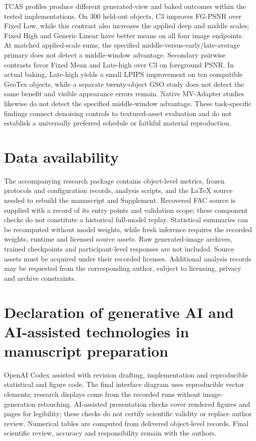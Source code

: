 \documentclass[times,twocolumn,final]{elsarticle}
\begin{document}
TCAS profiles produce different generated-view and baked outcomes within the tested implementations. On 300 held-out objects, C3 improves FG-PSNR over Fixed Low, while this contrast also increases the applied deep and middle scales; Fixed High and Generic Linear have better means on all four image endpoints. At matched applied-scale sums, the specified middle-versus-early/late-average primary does not detect a middle-window advantage. Secondary pairwise contrasts favor Fixed Mean and Late-high over C3 on foreground PSNR. In actual baking, Late-high yields a small LPIPS improvement on ten compatible GeoTex objects, while a separate twenty-object GSO study does not detect the same benefit and visible appearance errors remain. Native MV-Adapter studies likewise do not detect the specified middle-window advantage. These task-specific findings connect denoising controls to textured-asset evaluation and do not establish a universally preferred schedule or faithful material reproduction.

\section*{Data availability}

The accompanying research package contains object-level metrics, frozen protocols and configuration records, analysis scripts, and the LaTeX source needed to rebuild the manuscript and Supplement. Recovered FAC source is supplied with a record of its entry points and validation scope; these component checks do not constitute a historical full-model replay. Statistical summaries can be recomputed without model weights, while fresh inference requires the recorded weights, runtime and licensed source assets. Raw generated-image archives, trained checkpoints and participant-level responses are not included. Source assets must be acquired under their recorded licenses. Additional analysis records may be requested from the corresponding author, subject to licensing, privacy and archive constraints.

\section*{Declaration of generative AI and AI-assisted technologies in manuscript preparation}
OpenAI Codex assisted with revision drafting, implementation and reproducible statistical and figure code. The final interface diagram uses reproducible vector elements; research displays come from the recorded runs without image-generation retouching. AI-assisted presentation checks cover rendered figures and pages for legibility; these checks do not certify scientific validity or replace author review. Numerical tables are computed from delivered object-level records. Final scientific review, accuracy and responsibility remain with the authors.
\end{document}
